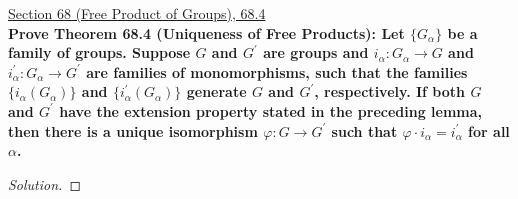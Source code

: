 \documentclass[11pt]{article}
\newenvironment{solution}
  {\renewcommand\qedsymbol{$\blacksquare$}\begin{proof}[Solution]}
  {\end{proof}}
\begin{document}
\underline{Section 68 (Free Product of Groups), 68.4} \\

\textbf{Prove Theorem 68.4 (Uniqueness of Free Products): Let $\{G_\alpha\}$ be a family of groups. Suppose $G$ and $G^{\prime}$ are groups
and $i_\alpha\colon G_\alpha \rightarrow G$ and $i^{\prime}_\alpha \colon G_\alpha \rightarrow G^{\prime}$ are families of monomorphisms, such that the families $\{ i_\alpha(G_\alpha) \}$ and $\{ i^{\prime}_\alpha(G_\alpha) \}$ generate $G$ and $G^{\prime}$, respectively.
If both $G$ and $G^{\prime}$ have the extension property stated in the preceding lemma, then there is a unique isomorphism $\varphi\colon G \rightarrow G^{\prime}$ such that $\varphi \cdot i_\alpha = i^{\prime}_\alpha$ for all $\alpha$.}

\begin{solution}

\end{solution}
\end{document}
